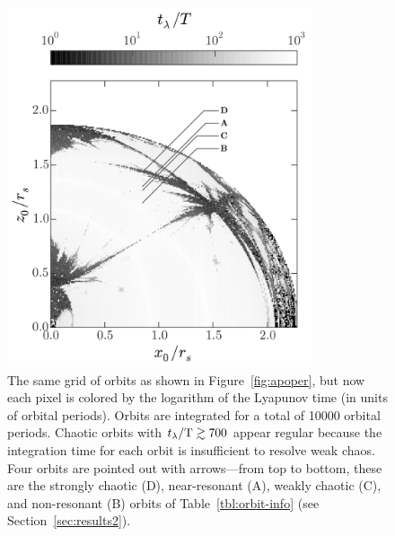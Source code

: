 \begin{figure}[!h]%
\begin{center}
\includegraphics[width=0.8\textwidth, trim={0 0 0 0}]{figures/ch3/lyap_map.pdf}
\caption{ The same grid of orbits as shown in Figure~\ref{fig:apoper}, but now
each pixel is colored by the logarithm of the Lyapunov time (in units of orbital
periods). Orbits are integrated for a total of 10000 orbital periods. Chaotic
orbits with $t_\lambda/{\rm T} \gtrsim 700$ appear regular because the
integration time for each orbit is insufficient to resolve weak chaos. Four
orbits are pointed out with arrows---from top to bottom, these are the strongly
chaotic (D), near-resonant (A), weakly chaotic (C), and non-resonant (B) orbits
of Table~\ref{tbl:orbit-info} (see Section~\ref{sec:results2}).}
\label{fig:lyapmap}
\end{center}
\end{figure}

